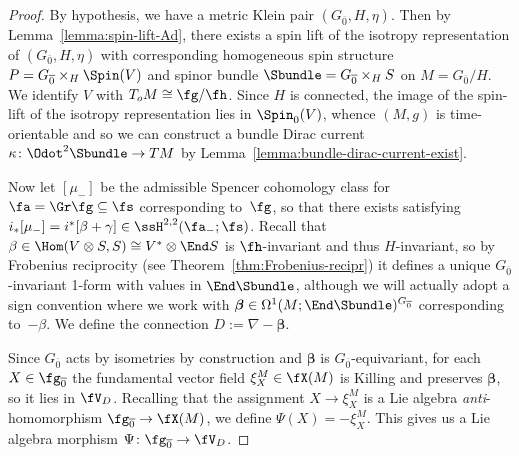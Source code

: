 \begin{proof}
	By hypothesis, we have a metric Klein pair $(G_{\overline0},H,\eta)$. Then by Lemma~\ref{lemma:spin-lift-Ad}, there exists a spin lift of the isotropy representation of $(G_{\overline0},H,\eta)$ with corresponding homogeneous spin structure $P=G_{\overline0}\times_H\Spin(V)$ and spinor bundle $\Sbundle=G_{\overline0}\times_H S$ on $M=G_{\overline0}/H$. We identify $V$ with $T_oM\cong\fg/\fh$. Since $H$ is connected, the image of the spin-lift of the isotropy representation lies in $\Spin_0(V)$, whence $(M,g)$ is time-orientable and so we can construct a bundle Dirac current~${\kappa\colon \Odot^2\Sbundle\to TM}$ by Lemma~\ref{lemma:bundle-dirac-current-exist}.
	
Now let $[\mu_-]$ be the admissible Spencer cohomology class for $\fa=\Gr\fg\subseteq \fs$ corresponding to~$\fg$, so that there exists  satisfying $i_*[\mu_-]=i^*[\beta+\gamma]\in\ssH^{2,2}(\fa_-;\fs)$. Recall that~${\beta\in\Hom(V\otimes S,S)\cong V^*\otimes\End S}$ is $\fh$-invariant and thus $H$-invariant, so by Frobenius reciprocity (see Theorem~\ref{thm:Frobenius-recipr}) it defines a unique $G_{\overline0}$-invariant 1-form with values in $\End\Sbundle$, although we will actually adopt a sign convention where we work with $\boldsymbol{\beta}\in\Omega^1(M;\End\Sbundle)^{G_{\overline0}}$ corresponding to~$-\beta$. We define the connection $D:=\nabla-\boldsymbol{\beta}$.

Since $G_{\overline 0}$ acts by isometries by construction and $\boldsymbol{\beta}$ is $G_{\overline 0}$-equivariant, for each $X\in\fg_{\overline 0}$ the fundamental vector field $\xi^M_X\in\fX(M)$ is Killing and preserves $\boldsymbol{\beta}$, so it lies in $\fV_D$. Recalling that the assignment $X\to\xi^M_X$ is a Lie algebra \emph{anti}-homomorphism $\fg_{\overline 0}\to \fX(M)$, we define $\Psi(X)=-\xi^M_X$. This gives us a Lie algebra morphism $\Psi\colon\fg_{\overline 0}\to\fV_D$.
	

\end{proof}
